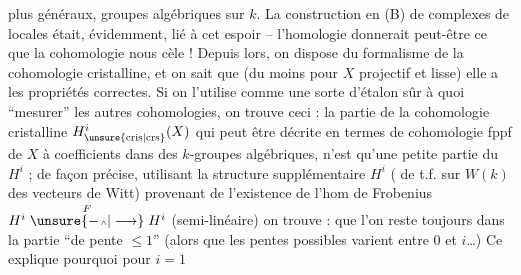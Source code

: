 plus généraux, groupes algébriques sur $k$. La construction en (B) de complexes de  locales était, évidemment,  lié à cet espoir -- l'homologie donnerait peut-être ce que la cohomologie nous cèle ! Depuis lors, on dispose du formalisme de la cohomologie cristalline, et on sait  que (du moins  pour $X$ projectif et lisse) elle a les propriétés correctes. Si on l'utilise comme une sorte d'étalon sûr à quoi ``mesurer'' les autres cohomologies, on trouve ceci : la partie de la cohomologie cristalline $H^i_{\unsure{\mathrm{cris}|\mathrm{crs}}}(X)$ qui peut être décrite en termes de cohomologie fppf de $X$ à coefficients dans des $k$-groupes algébriques, n'est qu'une  petite partie du $H^i$ ; de façon précise, utilisant la structure  supplémentaire  $H^i$ ( de t.f. sur  $W(k)$ des vecteurs de Witt) provenant de l'existence de l'hom de Frobenius $H^i\mathrel{\mathop{\unsure{\relbar\joinrel{\scriptscriptstyle\wedge}|\longrightarrow}}\limits^{F}}H^i$ (semi-linéaire) on trouve : que l'on reste toujours dans la partie ``de pente $\leq 1$'' (alors que les pentes possibles varient entre $0$ et $i$\ldots) Ce explique pourquoi pour $i=1$
